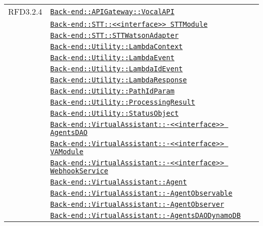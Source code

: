 \begin{longtable}{|>{\centering}m{3cm}|m{10cm}<{\centering}|}
RFD3.2.4 & \hyperref[Back-end::APIGateway::VocalAPI]{\texttt{Back-end::APIGateway::VocalAPI}}\\
& \hyperref[Back-end::STT::<<interface>> STTModule]{\texttt{Back-end::STT::<<interface>> STTModule}}\\
& \hyperref[Back-end::STT::STTWatsonAdapter]{\texttt{Back-end::STT::STTWatsonAdapter}}\\
& \hyperref[Back-end::Utility::LambdaContext]{\texttt{Back-end::Utility::LambdaContext}}\\
& \hyperref[Back-end::Utility::LambdaEvent]{\texttt{Back-end::Utility::LambdaEvent}}\\
& \hyperref[Back-end::Utility::LambdaIdEvent]{\texttt{Back-end::Utility::LambdaIdEvent}}\\
& \hyperref[Back-end::Utility::LambdaResponse]{\texttt{Back-end::Utility::LambdaResponse}}\\
& \hyperref[Back-end::Utility::PathIdParam]{\texttt{Back-end::Utility::PathIdParam}}\\
& \hyperref[Back-end::Utility::ProcessingResult]{\texttt{Back-end::Utility::ProcessingResult}}\\
& \hyperref[Back-end::Utility::StatusObject]{\texttt{Back-end::Utility::StatusObject}}\\
& \hyperref[Back-end::VirtualAssistant::<<interface>> AgentsDAO]{\texttt{Back-end::VirtualAssistant::-\linebreak <<interface>> AgentsDAO}}\\
& \hyperref[Back-end::VirtualAssistant::<<interface>> VAModule]{\texttt{Back-end::VirtualAssistant::-\linebreak <<interface>> VAModule}}\\
& \hyperref[Back-end::VirtualAssistant::<<interface>> WebhookService]{\texttt{Back-end::VirtualAssistant::-\linebreak <<interface>> WebhookService}}\\
& \hyperref[Back-end::VirtualAssistant::Agent]{\texttt{Back-end::VirtualAssistant::Agent}}\\
& \hyperref[Back-end::VirtualAssistant::AgentObservable]{\texttt{Back-end::VirtualAssistant::-\linebreak AgentObservable}}\\
& \hyperref[Back-end::VirtualAssistant::AgentObserver]{\texttt{Back-end::VirtualAssistant::-\linebreak AgentObserver}}\\
& \hyperref[Back-end::VirtualAssistant::AgentsDAODynamoDB]{\texttt{Back-end::VirtualAssistant::-\linebreak AgentsDAODynamoDB}}\\

\end{longtable}
